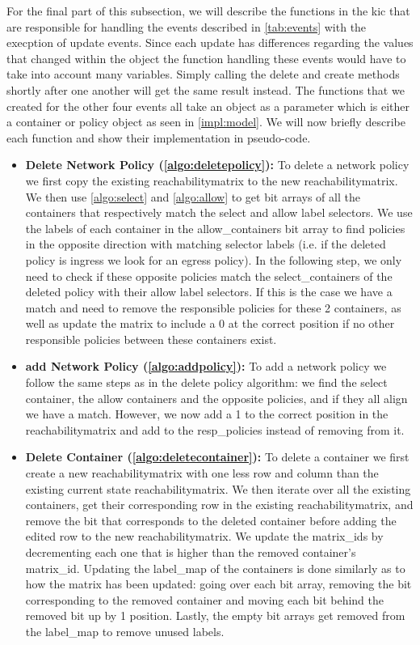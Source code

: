 \newpage
For the final part of this subsection, we will describe the functions in the \acrshort{kic} that are responsible for handling the events described in \autoref{tab:events} with the execption of update events. Since each update has differences regarding the values that changed within the object the function handling these events would have to take into account many variables. Simply calling the delete and create methods shortly after one another will get the same result instead. The functions that we created for the other four events all take an object as a parameter which is either a container or policy object as seen in \autoref{impl:model}. We will now briefly describe each function and show their implementation in pseudo-code.  
\\[10pt]
\begin{itemize}
    \item \textbf{Delete Network Policy (\autoref{algo:deletepolicy}):} To delete a network policy we first copy the existing reachabilitymatrix to the new reachabilitymatrix. We then use \autoref{algo:select} and \autoref{algo:allow} to get bit arrays of all the containers that respectively match the select and allow label selectors. We use the labels of each container in the allow\_containers bit array to find policies in the opposite direction with matching selector labels (i.e. if the deleted policy is ingress we look for an egress policy). In the following step, we only need to check if these opposite policies match the select\_containers of the deleted policy with their allow label selectors. If this is the case we have a match and need to remove the responsible policies for these 2 containers, as well as update the matrix to include a 0 at the correct position if no other responsible policies between these containers exist.
    
    \item \textbf{add Network Policy (\autoref{algo:addpolicy}):} To add a network policy we follow the same steps as in the delete policy algorithm: we find the select container, the allow containers and the opposite policies, and if they all align we have a match. However, we now add a 1 to the correct position in the reachabilitymatrix and add to the resp\_policies instead of removing from it.
    
    \item \textbf{Delete Container (\autoref{algo:deletecontainer}):} To delete a container we first create a new reachabilitymatrix with one less row and column than the existing current state reachabilitymatrix. We then iterate over all the existing containers, get their corresponding row in the existing reachabilitymatrix, and remove the bit that corresponds to the deleted container before adding the edited row to the new reachabilitymatrix. We update the matrix\_ids by decrementing each one that is higher than the removed container's matrix\_id. Updating the label\_map of the containers is done similarly as to how the matrix has been updated: going over each bit array, removing the bit corresponding to the removed container and moving each bit behind the removed bit up by 1 position. Lastly, the empty bit arrays get removed from the label\_map to remove unused labels.
    

\end{itemize}
